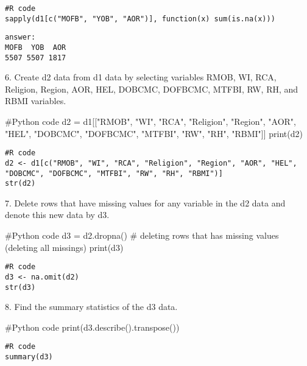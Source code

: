 \documentclass{article}
\begin{document}
\begin{verbatim}
#R code
sapply(d1[c("MOFB", "YOB", "AOR")], function(x) sum(is.na(x)))
\end{verbatim}

\begin{verbatim}
answer:
MOFB  YOB  AOR
5507 5507 1817
\end{verbatim}


6. Create d2 data from d1 data by selecting variables RMOB, WI, RCA, Religion, Region, AOR, HEL, DOBCMC, DOFBCMC, MTFBI, RW, RH, and RBMI variables.
\begin{pythoncode}
#Python code
d2 = d1[["RMOB", "WI", "RCA", "Religion", "Region", "AOR", "HEL", "DOBCMC", "DOFBCMC", "MTFBI", "RW", "RH", "RBMI"]]
print(d2)
\end{pythoncode}

\begin{verbatim}
#R code
d2 <- d1[c("RMOB", "WI", "RCA", "Religion", "Region", "AOR", "HEL", "DOBCMC", "DOFBCMC", "MTFBI", "RW", "RH", "RBMI")]
str(d2)
\end{verbatim}


7. Delete rows that have missing values for any variable in the d2 data and denote this new data by d3.
\begin{pythoncode}
#Python code
d3 = d2.dropna() # deleting rows that has missing values (deleting all missings)
print(d3)
\end{pythoncode}

\begin{verbatim}
#R code
d3 <- na.omit(d2)
str(d3)
\end{verbatim}


8. Find the summary statistics of the d3 data.
\begin{pythoncode}
#Python code
print(d3.describe().transpose())
\end{pythoncode}

\begin{verbatim}
#R code
summary(d3)
\end{verbatim}
\end{document}
